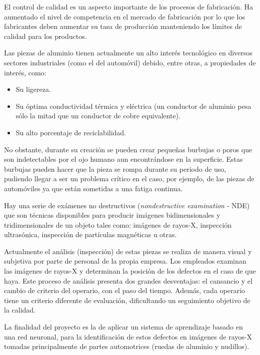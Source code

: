 
El control de calidad es un aspecto importante de los procesos de fabricación. Ha aumentado el nivel de competencia en el mercado de fabricación por lo que los fabricantes deben aumentar su tasa de producción manteniendo los límites de calidad para los productos.

Las piezas de aluminio tienen actualmente un alto interés tecnológico en diversos sectores industriales (como el del automóvil) debido, entre otras, a propiedades de interés, como:

\begin{itemize}
    \item Su ligereza.
    \item Su óptima conductividad térmica y eléctrica (un conductor de aluminio pesa sólo la mitad que un conductor de cobre equivalente).
    \item Su alto porcentaje de reciclabilidad.
\end{itemize}

No obstante, durante su creación se pueden crear pequeñas burbujas o poros que son indetectables por el ojo humano aun encontrándose en la superficie. Estas burbujas pueden hacer que la pieza se rompa durante su periodo de uso, pudiendo llegar a ser un problema crítico en el caso, por ejemplo, de las piezas de automóviles ya que están sometidas a una fatiga continua.

Hay una serie de exámenes no destructivos (\textit{nondestructive examination} - NDE) que son técnicas disponibles para producir imágenes bidimensionales y tridimensionales de un objeto tales como: imágenes de rayos-X, inspección ultrasónica, inspección de partículas magnéticas u otras.

Actualmente el análisis (inspección) de estas piezas se realiza de manera visual y subjetiva por parte de personal de la propia empresa. Los empleados examinan las imágenes de rayos-X y determinan la posición de los defectos en el caso de que haya. Este proceso de análisis presenta dos grandes desventajas: el cansancio y el cambio de criterio del operario, con el paso del tiempo. Además, cada operario tiene un criterio diferente de evaluación, dificultando un seguimiento objetivo de la calidad.

La finalidad del proyecto es la de aplicar un sistema de aprendizaje basado en una red neuronal, para la identificación de estos defectos en imágenes de rayos-X tomadas principalmente de partes automotrices (ruedas de aluminio y nudillos).

